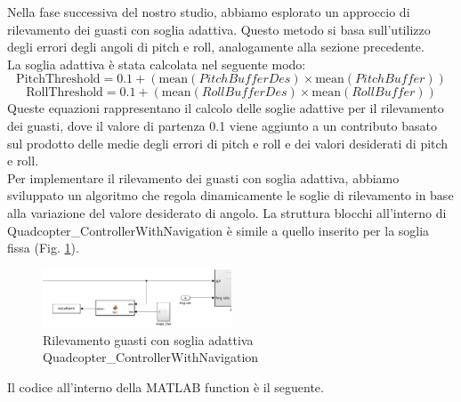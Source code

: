 Nella fase successiva del nostro studio, abbiamo esplorato un approccio di rilevamento dei guasti con soglia adattiva. Questo metodo si basa sull'utilizzo degli errori degli angoli di pitch e roll, analogamente alla sezione precedente.
\\
La soglia adattiva è stata calcolata nel seguente modo:
\begin{equation}
\text{PitchThreshold} = 0.1 + \left(\text{mean}(PitchBufferDes) \times \text{mean}(PitchBuffer)\right)
\end{equation}
\begin{equation}
\text{RollThreshold} = 0.1 + \left(\text{mean}(RollBufferDes) \times \text{mean}(RollBuffer)\right)
\end{equation}
\noindent
Queste equazioni rappresentano il calcolo delle soglie adattive per il rilevamento dei guasti, dove il valore di partenza 0.1 viene aggiunto a un contributo basato sul prodotto delle medie degli errori di pitch e roll e dei valori desiderati di pitch e roll.
\\
Per implementare il rilevamento dei guasti con soglia adattiva, abbiamo sviluppato un algoritmo che regola dinamicamente le soglie di rilevamento in base alla variazione del valore desiderato di angolo. La struttura blocchi all'interno di Quadcopter\_ControllerWithNavigation è simile a quello inserito per la soglia fissa (Fig. \ref{Rilevamento guasti con soglia adattiva Quadcopter\_ControllerWithNavigation}).
\\
\begin{figure}[H]
    \centering
    \includegraphics[width=0.5\textwidth]{files/images/WhatsApp Image 2024-03-15 at 18.28.16.jpeg}
    \caption{Rilevamento guasti con soglia adattiva Quadcopter\_ControllerWithNavigation}
    \label{Rilevamento guasti con soglia adattiva Quadcopter\_ControllerWithNavigation}
\end{figure}
\noindent
Il codice all'interno della MATLAB function è il seguente.
